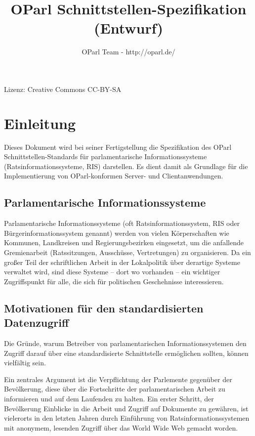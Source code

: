 \documentclass[,a4paper]{article}
\title{OParl Schnittstellen-Spezifikation (Entwurf)}
\author{OParl Team - http://oparl.de/}
\date{}
\begin{document}
\maketitle

Lizenz: Creative Commons CC-BY-SA

\section{Einleitung}

Dieses Dokument wird bei seiner Fertigstellung die Spezifikation des
OParl Schnittstellen-Standards für parlamentarische Informationssysteme
(Ratsinformationssysteme, RIS) darstellen. Es dient damit als Grundlage
für die Implementierung von OParl-konformen Server- und
Clientanwendungen.

\subsection{Parlamentarische Informationssysteme}

Parlamentarische Informationssysteme (oft Ratsinformationssystem, RIS
oder Bürgerinformationssystem genannt) werden von vielen Körperschaften
wie Kommunen, Landkreisen und Regierungsbezirken eingesetzt, um die
anfallende Gremienarbeit (Ratssitzungen, Ausschüsse, Vertretungen) zu
organisieren. Da ein großer Teil der schriftlichen Arbeit in der
Lokalpolitik über derartige Systeme verwaltet wird, sind diese Systeme
-- dort wo vorhanden -- ein wichtiger Zugriffspunkt für alle, die sich
für politischen Geschehnisse interessieren.

\subsection{Motivationen für den standardisierten Datenzugriff}

Die Gründe, warum Betreiber von parlamentarischen Informationssystemen
den Zugriff darauf über eine standardisierte Schnittstelle ermöglichen
sollten, können vielfältig sein.

Ein zentrales Argument ist die Verpflichtung der Parlemente gegenüber
der Bevölkerung, diese über die Fortschritte der parlamentarischen
Arbeit zu informieren und auf dem Laufenden zu halten. Ein erster
Schritt, der Bevölkerung Einblicke in die Arbeit und Zugriff auf
Dokumente zu gewähren, ist vielerorts in den letzten Jahren durch
Einführung von Ratsinformationssystemen mit anonymem, lesenden Zugriff
über das World Wide Web gemacht worden.
\end{document}
